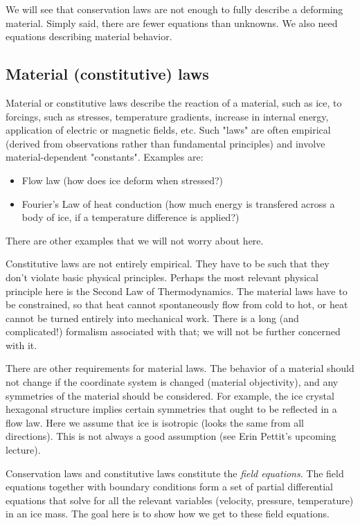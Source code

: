 \documentclass[12pt, openany]{memoir}
\begin{document}
We will see that conservation laws are not enough to fully describe a
deforming material. Simply said, there are fewer equations than
unknowns. We also need equations describing material behavior.

\subsection{Material (constitutive) laws}

Material or constitutive laws describe the reaction of a material,
such as ice, to forcings, such as stresses, temperature gradients,
increase in internal energy, application of electric or magnetic
fields, etc. Such "laws" are often empirical (derived from observations rather than fundamental principles) and involve material-dependent "constants". Examples are:

\begin{itemize}
\item Flow law (how does ice deform when stressed?)
\item Fourier's Law of heat conduction (how much energy is transfered across a body of ice, if a temperature difference is applied?)
\end{itemize}

There are other examples that we will not worry about here.

Constitutive laws are not entirely empirical. They have to be such
that they don't violate basic physical principles. Perhaps the most
relevant physical principle here is the Second Law of
Thermodynamics. The material laws have to be constrained, so that heat
cannot spontaneously flow from cold to hot, or heat cannot be turned
entirely into mechanical work. There is a long (and complicated!)
formalism associated with that; we will not be further concerned with
it.

There are other requirements for material laws. The behavior of a
material should not change if the coordinate system is changed
(material objectivity), and any symmetries of the material should be
considered. For example, the ice crystal hexagonal structure implies
certain symmetries that ought to be reflected in a flow law. Here we
assume that ice is isotropic (looks the same from all
directions). This is not always a good assumption (see Erin Pettit's
upcoming lecture).

Conservation laws and constitutive laws constitute the \emph{field
equations}. The field equations together with boundary conditions form
a set of partial differential equations that solve for all the
relevant variables (velocity, pressure, temperature) in an ice
mass. The goal here is to show how we get to these field equations.
\end{document}
